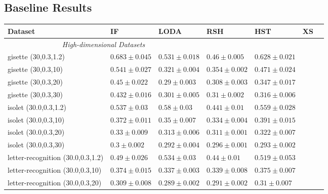 \subsection{Baseline Results}
\begin{footnotesize}
\begin{table}[ht!]
    \centering
		\begin{tabular}{lllllll}
				\toprule
				\textbf{Dataset} & \textbf{IF} &  \textbf{LODA} & \textbf{RSH} &  \textbf{HST}  & \textbf{XS}\\
				\midrule
				\multicolumn{3}{c}{\textit{High-dimensional Datasets}}\\
gisette (30,0.3,1.2)& $0.683 \pm 0.045$ &  $0.531 \pm 0.018$ &  $0.46 \pm 0.005$ &  $0.628 \pm 0.021$    \\
gisette (30,0.3,10)& $0.541 \pm 0.027$ &  $0.321 \pm 0.004$ &  $0.354 \pm 0.002$ &  $0.471 \pm 0.024$    \\
gisette (30,0.3,20)& $0.45 \pm 0.022$ &  $0.29 \pm 0.003$ &  $0.308 \pm 0.003$ &  $0.347 \pm 0.017$    \\
gisette (30,0.3,30)& $0.432 \pm 0.016$ &  $0.301 \pm 0.005$ &  $0.31 \pm 0.002$ &  $0.316 \pm 0.006$    \\
\midrule
isolet (30.0,0.3,1.2)& $0.537 \pm 0.03$ &  $0.58 \pm 0.03$ &  $0.441 \pm 0.01$ &  $0.559 \pm 0.028$    \\
isolet (30.0,0.3,10)& $0.372 \pm 0.011$ &  $0.35 \pm 0.007$ &  $0.334 \pm 0.004$ &  $0.391 \pm 0.015$    \\
isolet (30.0,0.3,20)& $0.33 \pm 0.009$ &  $0.313 \pm 0.006$ &  $0.311 \pm 0.001$ &  $0.322 \pm 0.007$    \\
isolet (30.0,0.3,30)& $0.3 \pm 0.002$ &  $0.292 \pm 0.004$ &  $0.296 \pm 0.001$ &  $0.293 \pm 0.002$    \\
\midrule
letter-recognition (30.0,0.3,1.2)& $0.49 \pm 0.026$ &  $0.534 \pm 0.03$ &  $0.44 \pm 0.01$ &  $0.519 \pm 0.053$    \\
letter-recognition (30.0,0.3,10)& $0.374 \pm 0.015$ &  $0.337 \pm 0.003$ &  $0.339 \pm 0.008$ &  $0.375 \pm 0.007$    \\
letter-recognition (30.0,0.3,20)& $0.309 \pm 0.008$ &  $0.289 \pm 0.002$ &  $0.291 \pm 0.002$ &  $0.31 \pm 0.007$    \\

\end{tabular}
\end{table}
\end{footnotesize}
